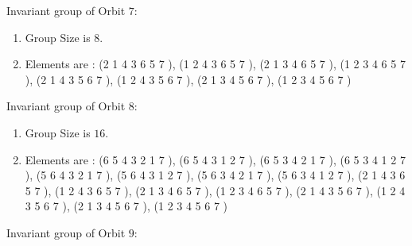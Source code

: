 \documentclass[12pt]{article}
\begin{document}
Invariant group of Orbit $7$:
\begin{enumerate}
\item Group Size is $8$.
\item Elements are : (2 1 4 3 6 5 7  ), (1 2 4 3 6 5 7  ), (2 1 3 4 6 5 7  ), (1 2 3 4 6 5 7  ), (2 1 4 3 5 6 7  ), (1 2 4 3 5 6 7  ), (2 1 3 4 5 6 7  ), (1 2 3 4 5 6 7  )
\end{enumerate}
Invariant group of Orbit $8$:
\begin{enumerate}
\item Group Size is $16$.
\item Elements are : (6 5 4 3 2 1 7  ), (6 5 4 3 1 2 7  ), (6 5 3 4 2 1 7  ), (6 5 3 4 1 2 7  ), (5 6 4 3 2 1 7  ), (5 6 4 3 1 2 7  ), (5 6 3 4 2 1 7  ), (5 6 3 4 1 2 7  ), (2 1 4 3 6 5 7  ), (1 2 4 3 6 5 7  ), (2 1 3 4 6 5 7  ), (1 2 3 4 6 5 7  ), (2 1 4 3 5 6 7  ), (1 2 4 3 5 6 7  ), (2 1 3 4 5 6 7  ), (1 2 3 4 5 6 7  )
\end{enumerate}
Invariant group of Orbit $9$:
\end{document}
